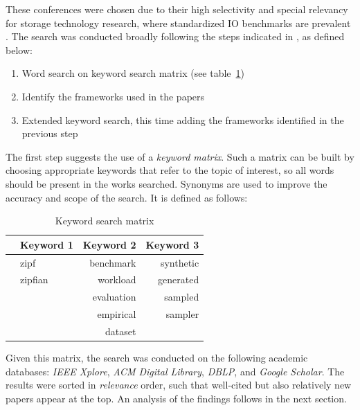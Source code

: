 These conferences were chosen due to their high selectivity and special relevancy for storage technology research, where standardized IO benchmarks are prevalent
. The search was conducted broadly following the steps indicated in \parencite{bramerSystematicApproachSearching2018}, as defined below: 
\begin{enumerate}
    \item Word search on keyword search matrix (see table~\ref{tab:keyword_search_matrix})
    \item Identify the frameworks used in the papers
    \item Extended keyword search, this time adding the frameworks identified in the previous step
\end{enumerate} 

The first step suggests the use of a \textit{keyword matrix}. Such a matrix can be built by choosing appropriate keywords
that refer to the topic of interest, so all words should be present in the works searched. 
Synonyms are used to improve the accuracy and scope of the search. It is defined as follows:

\begin{table}[h!]
    \centering
    \begin{tabular}{|c|l|r|r|}
      \hline
       & \multicolumn{1}{c|}{Keyword 1} & \multicolumn{1}{c|}{Keyword 2} & \multicolumn{1}{c|}{Keyword 3} \\ \hline
       \parbox[t]{4mm}{}
       & zipf   &   benchmark     &    synthetic      \\
       & zipfian   &   workload     &    generated      \\
       &    &   evaluation     &    sampled      \\
       &    &   empirical     &    sampler      \\
       &   &   dataset     &         \\ \hline
    \end{tabular}
    \caption{Keyword search matrix}
    \label{tab:keyword_search_matrix}
  \end{table} 

Given this matrix, the search was conducted on the following academic databases: \textit{IEEE Xplore}, \textit{ACM Digital Library}, \textit{DBLP}, and \textit{Google Scholar}. 
The results were sorted in \textit{relevance} order, such that well-cited but also relatively new papers appear at the top. An analysis of the findings follows in the next section.

